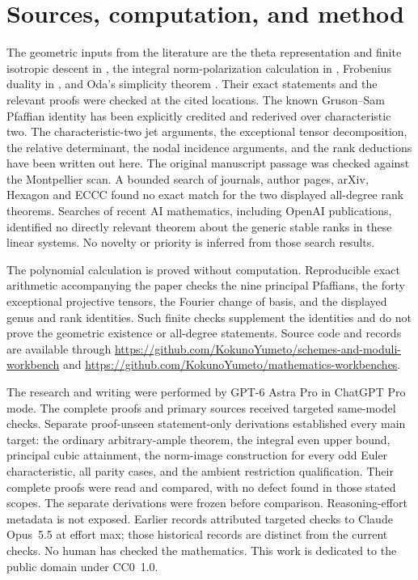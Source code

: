 \documentclass[11pt]{article}
\theoremstyle{definition}\newtheorem{definition}[theorem]{Definition}
\theoremstyle{remark}\newtheorem{remark}[theorem]{Remark}
\newcommand{\workbenchurl}{https://github.com/KokunoYumeto/schemes-and-moduli-workbench}
\newcommand{\recordurl}{https://github.com/KokunoYumeto/mathematics-workbenches}
\begin{document}
\section*{Sources, computation, and method}

The geometric inputs from the literature are the theta representation and finite isotropic descent in \citet{EGM}, the integral norm-polarization calculation in \citet{Debarre}, Frobenius duality in \citet{BrionKumar}, and Oda's simplicity theorem \citep{Oda}. Their exact statements and the relevant proofs were checked at the cited locations. The known Gruson--Sam Pfaffian identity has been explicitly credited and rederived over characteristic two. The characteristic-two jet arguments, the exceptional tensor decomposition, the relative determinant, the nodal incidence arguments, and the rank deductions have been written out here. The original manuscript passage was checked against the Montpellier scan. A bounded search of journals, author pages, arXiv, Hexagon and ECCC found no exact match for the two displayed all-degree rank theorems. Searches of recent AI mathematics, including OpenAI publications, identified no directly relevant theorem about the generic stable ranks in these linear systems. No novelty or priority is inferred from those search results.

The polynomial calculation is proved without computation. Reproducible exact arithmetic accompanying the paper checks the nine principal Pfaffians, the forty exceptional projective tensors, the Fourier change of basis, and the displayed genus and rank identities. Such finite checks supplement the identities and do not prove the geometric existence or all-degree statements. Source code and records are available through \url{\workbenchurl} and \url{\recordurl}.

The research and writing were performed by GPT-6 Astra Pro in ChatGPT Pro mode. The complete proofs and primary sources received targeted same-model checks. Separate proof-unseen statement-only derivations established every main target: the ordinary arbitrary-ample theorem, the integral even upper bound, principal cubic attainment, the norm-image construction for every odd Euler characteristic, all parity cases, and the ambient restriction qualification. Their complete proofs were read and compared, with no defect found in those stated scopes. The separate derivations were frozen before comparison. Reasoning-effort metadata is not exposed. Earlier records attributed targeted checks to Claude Opus~5.5 at effort max; those historical records are distinct from the current checks. No human has checked the mathematics. This work is dedicated to the public domain under CC0~1.0.
\end{document}
